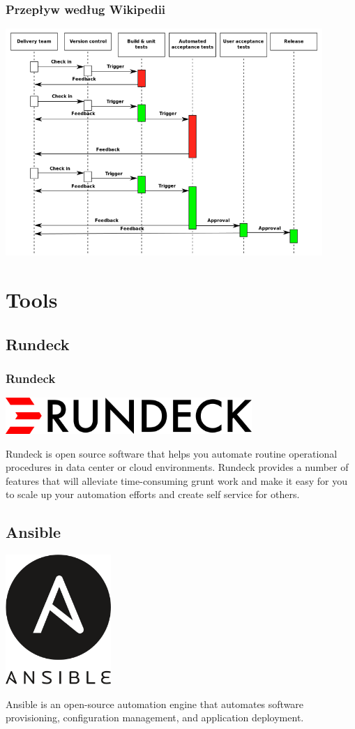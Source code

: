\documentclass[10pt]{beamer}
\begin{document}
\begin{frame}
\frametitle{Przepływ według Wikipedii}
\begin{center}
\includegraphics[width=0.9\textwidth]{diagram.png}
\end{center}
\end{frame}
\section{Tools}
\subsection{Rundeck}
\begin{frame}
\frametitle{Rundeck}
\begin{center}
\includegraphics[width=0.7\textwidth]{rundeck.png}
\end{center}
Rundeck is open source software that helps you automate routine operational procedures in data center or cloud environments. Rundeck provides a number of features that will alleviate time-consuming grunt work and make it easy for you to scale up your automation efforts and create self service for others. 
\end{frame}
\subsection{Ansible}
\begin{frame}
\begin{center}
\includegraphics[width=0.3\textwidth]{ansible.png}
\end{center}
Ansible is an open-source automation engine that automates software provisioning, configuration management, and application deployment.
\end{frame}
\end{document}
